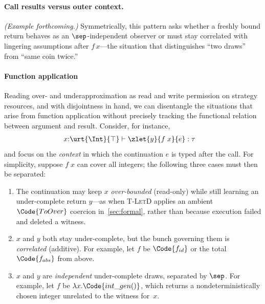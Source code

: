 \paragraph{Call results versus outer context.}
\emph{(Example forthcoming.)}
Symmetrically, this pattern asks whether a freshly bound return behaves as an \(\sep\)-independent observer or must stay correlated with lingering assumptions after \(f\,x\)---the situation that distinguishes ``two draws'' from ``same coin twice.''

\paragraph{Function application} Reading over- and underapproximation as read and write permission on strategy resources, and with disjointness in hand, we can disentangle the situations that arise from function application without precisely tracking the functional relation between argument and result.
Consider, for instance,
\begin{align*}
  &x{:}\urt{\Int}{\top} \vdash \zlet{y}{f\;x}{e} : \tau
\end{align*}
and focus on the \emph{context} in which the continuation $e$ is typed after the call. For simplicity, suppose $f\;x$ can cover all integers; the following three cases must then be separated:
\begin{enumerate}
\item The continuation may keep $x$ \emph{over-bounded} (read-only) while still learning an under-complete return $y$---as when \textsc{T-LetD} applies an ambient $\Code{ToOver}$ coercion in~\autoref{sec:formal}, rather than because execution failed and deleted a witness.
\item $x$ and $y$ both stay under-complete, but the bunch governing them is \emph{correlated} (additive). For example, let $f$ be $\Code{f_{id}}$ or the total $\Code{f_{abs}}$ from above.
\item $x$ and $y$ are \emph{independent} under-complete draws, separated by $\sep$. For example, let $f$ be $\lambda x.\Code{int\_gen()}$, which returns a nondeterministically chosen integer unrelated to the witness for~$x$.
\end{enumerate}

